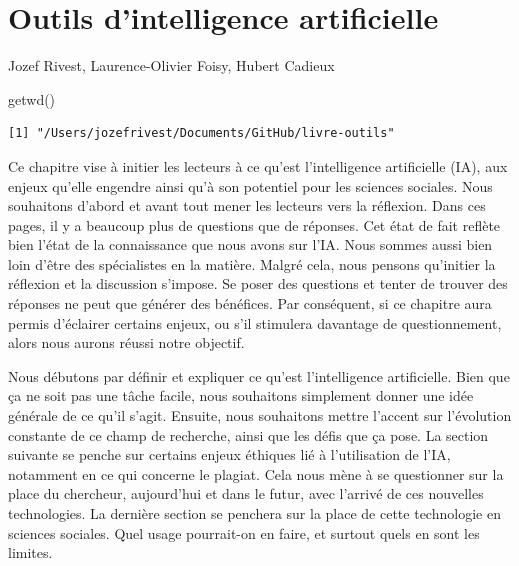 \documentclass[
  letterpaper,
]{scrbook}
\newenvironment{Shaded}{\begin{snugshade}}{\end{snugshade}}
\newcommand{\FunctionTok}[1]{\textcolor[rgb]{0.28,0.35,0.67}{#1}}
\newcommand{\NormalTok}[1]{\textcolor[rgb]{0.00,0.23,0.31}{#1}}
\begin{document}

\hypertarget{outils-dintelligence-artificielle}{%
\chapter{Outils d'intelligence
artificielle}\label{outils-dintelligence-artificielle}}

\begin{center}

Jozef Rivest, Laurence-Olivier Foisy, Hubert Cadieux

\end{center}

\begin{Shaded}
\begin{Highlighting}[]
\FunctionTok{getwd}\NormalTok{()}
\end{Highlighting}
\end{Shaded}

\begin{verbatim}
[1] "/Users/jozefrivest/Documents/GitHub/livre-outils"
\end{verbatim}

Ce chapitre vise à initier les lecteurs à ce qu'est l'intelligence
artificielle (IA), aux enjeux qu'elle engendre ainsi qu'à son potentiel
pour les sciences sociales. Nous souhaitons d'abord et avant tout mener
les lecteurs vers la réflexion. Dans ces pages, il y a beaucoup plus de
questions que de réponses. Cet état de fait reflète bien l'état de la
connaissance que nous avons sur l'IA. Nous sommes aussi bien loin d'être
des spécialistes en la matière. Malgré cela, nous pensons qu'initier la
réflexion et la discussion s'impose. Se poser des questions et tenter de
trouver des réponses ne peut que générer des bénéfices. Par conséquent,
si ce chapitre aura permis d'éclairer certains enjeux, ou s'il stimulera
davantage de questionnement, alors nous aurons réussi notre objectif.

Nous débutons par définir et expliquer ce qu'est l'intelligence
artificielle. Bien que ça ne soit pas une tâche facile, nous souhaitons
simplement donner une idée générale de ce qu'il s'agit. Ensuite, nous
souhaitons mettre l'accent sur l'évolution constante de ce champ de
recherche, ainsi que les défis que ça pose. La section suivante se
penche sur certains enjeux éthiques lié à l'utilisation de l'IA,
notamment en ce qui concerne le plagiat. Cela nous mène à se questionner
sur la place du chercheur, aujourd'hui et dans le futur, avec l'arrivé
de ces nouvelles technologies. La dernière section se penchera sur la
place de cette technologie en sciences sociales. Quel usage pourrait-on
en faire, et surtout quels en sont les limites.
\end{document}
